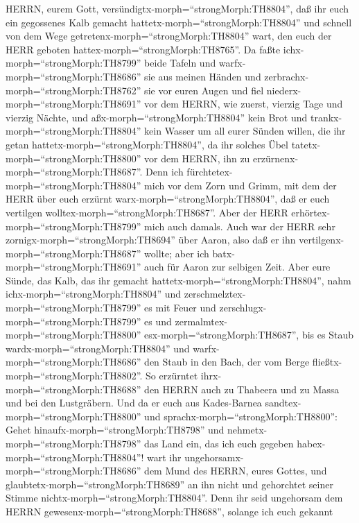 HERRN, eurem Gott, versündigtx-morph=``strongMorph:TH8804'', daß ihr
euch ein gegossenes Kalb gemacht hattetx-morph=``strongMorph:TH8804''
und schnell von dem Wege getretenx-morph=``strongMorph:TH8804'' wart,
den euch der HERR geboten hattex-morph=``strongMorph:TH8765''.
 Da faßte ichx-morph=``strongMorph:TH8799'' beide Tafeln
und warfx-morph=``strongMorph:TH8686'' sie aus meinen Händen und
zerbrachx-morph=``strongMorph:TH8762'' sie vor euren Augen 
und fiel niederx-morph=``strongMorph:TH8691'' vor dem HERRN, wie zuerst,
vierzig Tage und vierzig Nächte, und aßx-morph=``strongMorph:TH8804''
kein Brot und trankx-morph=``strongMorph:TH8804'' kein Wasser um all
eurer Sünden willen, die ihr getan hattetx-morph=``strongMorph:TH8804'',
da ihr solches Übel tatetx-morph=``strongMorph:TH8800'' vor dem HERRN,
ihn zu erzürnenx-morph=``strongMorph:TH8687''.  Denn ich
fürchtetex-morph=``strongMorph:TH8804'' mich vor dem Zorn und Grimm, mit
dem der HERR über euch erzürnt warx-morph=``strongMorph:TH8804'', daß er
euch vertilgen wolltex-morph=``strongMorph:TH8687''. Aber der HERR
erhörtex-morph=``strongMorph:TH8799'' mich auch damals. 
Auch war der HERR sehr zornigx-morph=``strongMorph:TH8694'' über Aaron,
also daß er ihn vertilgenx-morph=``strongMorph:TH8687'' wollte; aber ich
batx-morph=``strongMorph:TH8691'' auch für Aaron zur selbigen Zeit.
 Aber eure Sünde, das Kalb, das ihr gemacht
hattetx-morph=``strongMorph:TH8804'', nahm
ichx-morph=``strongMorph:TH8804'' und
zerschmelztex-morph=``strongMorph:TH8799'' es mit Feuer und
zerschlugx-morph=``strongMorph:TH8799'' es und
zermalmtex-morph=``strongMorph:TH8800''
esx-morph=``strongMorph:TH8687'', bis es Staub
wardx-morph=``strongMorph:TH8804'' und
warfx-morph=``strongMorph:TH8686'' den Staub in den Bach, der vom Berge
fließtx-morph=``strongMorph:TH8802''.  So erzürntet
ihrx-morph=``strongMorph:TH8688'' den HERRN auch zu Thabeera und zu
Massa und bei den Lustgräbern.  Und da er euch aus
Kades-Barnea sandtex-morph=``strongMorph:TH8800'' und
sprachx-morph=``strongMorph:TH8800'': Gehet
hinaufx-morph=``strongMorph:TH8798'' und
nehmetx-morph=``strongMorph:TH8798'' das Land ein, das ich euch gegeben
habex-morph=``strongMorph:TH8804''! wart ihr
ungehorsamx-morph=``strongMorph:TH8686'' dem Mund des HERRN, eures
Gottes, und glaubtetx-morph=``strongMorph:TH8689'' an ihn nicht und
gehorchtet seiner Stimme nichtx-morph=``strongMorph:TH8804''.
 Denn ihr seid ungehorsam dem HERRN
gewesenx-morph=``strongMorph:TH8688'', solange ich euch gekannt
